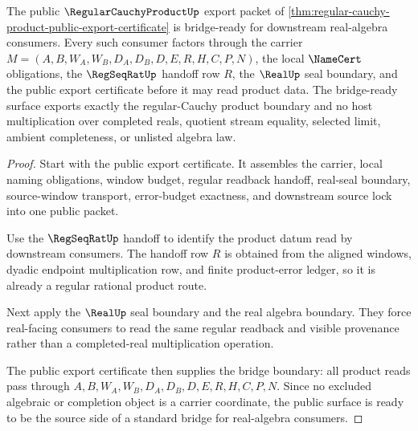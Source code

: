 \begin{theorem}
\label{thm:regular-cauchy-product-bridge-readiness}
The public $\RegularCauchyProductUp$ export packet of \autoref{thm:regular-cauchy-product-public-export-certificate} is bridge-ready for downstream real-algebra consumers. Every such consumer factors through the carrier $M=(A,B,W_A,W_B,D_A,D_B,D,E,R,H,C,P,N)$, the local $\NameCert$ obligations, the $\RegSeqRatUp$ handoff row $R$, the $\RealUp$ seal boundary, and the public export certificate before it may read product data. The bridge-ready surface exports exactly the regular-Cauchy product boundary and no host multiplication over completed reals, quotient stream equality, selected limit, ambient completeness, or unlisted algebra law.
\end{theorem}
\begin{proof}
Start with the public export certificate. It assembles the carrier, local naming obligations, window budget, regular readback handoff, real-seal boundary, source-window transport, error-budget exactness, and downstream source lock into one public packet.

Use the $\RegSeqRatUp$ handoff to identify the product datum read by downstream consumers. The handoff row $R$ is obtained from the aligned windows, dyadic endpoint multiplication row, and finite product-error ledger, so it is already a regular rational product route.

Next apply the $\RealUp$ seal boundary and the real algebra boundary. They force real-facing consumers to read the same regular readback and visible provenance rather than a completed-real multiplication operation.

The public export certificate then supplies the bridge boundary: all product reads pass through $A,B,W_A,W_B,D_A,D_B,D,E,R,H,C,P,N$. Since no excluded algebraic or completion object is a carrier coordinate, the public surface is ready to be the source side of a standard bridge for real-algebra consumers.
\end{proof}

